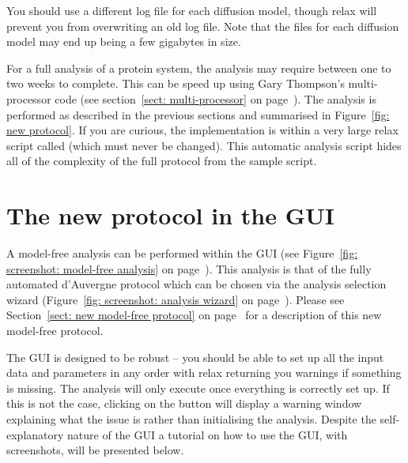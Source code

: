 \begin{htmlonly}
\begin{htmlonly}
You should use a different log file for each diffusion model, though relax will prevent you from overwriting an old log file.  Note that the  files for each diffusion model may end up being a few gigabytes in size.

For a full analysis of a protein system, the analysis may require between one to two weeks to complete.  This can be speed up using Gary Thompson's multi-processor code (see section~\ref{sect: multi-processor} on page~\pageref{sect: multi-processor}).  The analysis is performed as described in the previous sections and summarised in Figure~\ref{fig: new protocol}.  If you are curious, the implementation is within a very large relax script called  (which must never be changed).  This automatic analysis script hides all of the complexity of the full protocol from the sample script.




\newpage
\section{The new protocol in the GUI}

A model-free analysis can be performed within the GUI (see Figure~\ref{fig: screenshot: model-free analysis} on page~\pageref{fig: screenshot: model-free analysis}).  This analysis is that of the fully automated d'Auvergne protocol which can be chosen via the analysis selection wizard (Figure~\ref{fig: screenshot: analysis wizard} on page~\pageref{fig: screenshot: analysis wizard}).  Please see Section~\ref{sect: new model-free protocol} on page~\pageref{sect: new model-free protocol} for a description of this new model-free protocol.

The GUI is designed to be robust -- you should be able to set up all the input data and parameters in any order with relax returning you warnings if something is missing.  The analysis will only execute once everything is correctly set up.  If this is not the case, clicking on the  button will display a warning window explaining what the issue is rather than initialising the analysis.  Despite the self-explanatory nature of the GUI a tutorial on how to use the GUI, with screenshots, will be presented below.


\end{htmlonly}
\end{htmlonly}
